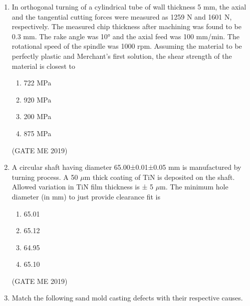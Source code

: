 \documentclass[journal]{IEEEtran}
\begin{document}
\begin{enumerate}
\begin{multicols}{2}
\begin{enumerate}
    \item 340 MPa (compressive)
    \item 340 MPa (tensile)
    \item 260 MPa (compressive)
    \item 260 MPa (tensile)
\end{enumerate}
\end{multicols}
\hfill (GATE ME 2019)

\item In orthogonal turning of a cylindrical tube of wall thickness 5 mm, the axial and the tangential cutting forces were measured as 1259 N and 1601 N, respectively. The measured chip thickness after machining was found to be 0.3 mm. The rake angle was 10° and the axial feed was 100 mm/min. The rotational speed of the spindle was 1000 rpm. Assuming the material to be perfectly plastic and Merchant's first solution, the shear strength of the material is closest to
\begin{multicols}{4}
\begin{enumerate}
    \item 722 MPa
    \item 920 MPa
    \item 200 MPa
    \item 875 MPa
\end{enumerate}
\end{multicols}
\hfill (GATE ME 2019)

\item A circular shaft having diameter 65.00±0.01±0.05 mm is manufactured by turning process. A 50 $\mu$m thick coating of TiN is deposited on the shaft. Allowed variation in TiN film thickness is ± 5 $\mu$m. The minimum hole diameter (in mm) to just provide clearance fit is
\begin{multicols}{4}
\begin{enumerate}
    \item 65.01
    \item 65.12
    \item 64.95
    \item 65.10
\end{enumerate}
\end{multicols}
\hfill (GATE ME 2019)

\item Match the following sand mold casting defects with their respective causes.


\end{enumerate}
\end{document}

